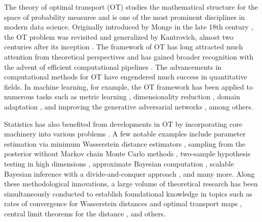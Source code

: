 \documentclass[11pt]{article}
\begin{document}
The theory of optimal transport (OT) studies the mathematical structure for the space of probability measures and is one of the most prominent disciplines in modern data science. Originally introduced by Monge in the late 18th century \citep{monge_1781_MemoireTheorieDeblais}, the OT problem was revisited and generalized by Kantrovich, almost two centuries after its inception \citep{kantorovitch_1958_TranslocationMasses}. The framework of OT has long attracted much attention from theoretical perspectives \citep{ambrosio_2003_OptimalTransportationApplications, villani_2003_TopicsOptimalTransportation} and has gained broader recognition with the advent of efficient computational pipelines  \citep{cuturi_2013_SinkhornDistancesLightspeed, peyre_2019_ComputationalOptimalTransport}. The advancements in computational methods for OT have engendered much success in quantitative fields. In machine learning, for example, the OT framework has been applied to numerous tasks such as metric learning \citep{kolouri_2016_SlicedWassersteinKernels}, dimensionality reduction \citep{bigot_2018_CharacterizationBarycentersWasserstein},  domain adaptation \citep{courty_2017_OptimalTransportDomain, courty_2017_JointDistributionOptimal}, and improving the generative adversarial networks \citep{arjovsky_2017_WassersteinGenerativeAdversarial}, among others.


Statistics has also benefited from developments in OT by incorporating core machinery into various problems \citep{panaretos_2020_InvitationStatisticsWasserstein}. A few notable examples include parameter estimation via  minimum Wasserstein distance estimators \citep{bernton_2019_ParameterEstimationWasserstein}, sampling from the posterior without Markov chain Monte Carlo methods \citep{elmoselhy_2012_BayesianInferenceOptimal}, two-sample hypothesis testing in high dimensions \citep{ramdas_2017_WassersteinTwoSampleTesting}, approximate Bayesian computation \citep{bernton_2019_ApproximateBayesianComputation}, scalable Bayesian inference with a divide-and-conquer approach \citep{srivastava_2018_ScalableBayesBarycenter}, and many more. Along these methodological innovations, a large volume of theoretical research has been simultaneously conducted to establish foundational knowledge in topics such as rates of convergence for Wasserstein distances \citep{fournier_2015_RateConvergenceWasserstein} and optimal transport maps \citep{hutter_2021_MinimaxEstimationSmooth}, central limit theorems for the distance \citep{delbarrio_1999_CentralLimitTheorems, manole_2021_PluginEstimationSmooth}, and others. 
\end{document}

